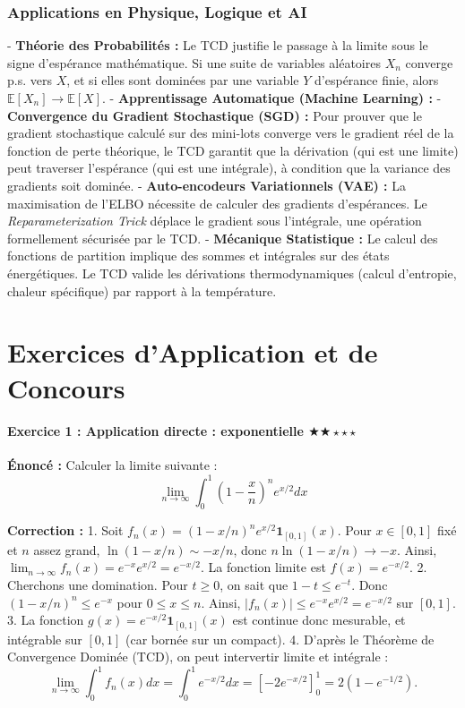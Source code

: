 \documentclass[11pt,a4paper]{article}
\begin{document}
\section{Applications en Physique, Logique et AI}

- \textbf{Théorie des Probabilités :} Le TCD justifie le passage à la limite sous le signe d'espérance mathématique. Si une suite de variables aléatoires $X_n$ converge p.s. vers $X$, et si elles sont dominées par une variable $Y$ d'espérance finie, alors $\mathbb{E}[X_n] \to \mathbb{E}[X]$.
- \textbf{Apprentissage Automatique (Machine Learning) :}
    - \textbf{Convergence du Gradient Stochastique (SGD) :} Pour prouver que le gradient stochastique calculé sur des mini-lots converge vers le gradient réel de la fonction de perte théorique, le TCD garantit que la dérivation (qui est une limite) peut traverser l'espérance (qui est une intégrale), à condition que la variance des gradients soit dominée.
    - \textbf{Auto-encodeurs Variationnels (VAE) :} La maximisation de l'ELBO nécessite de calculer des gradients d'espérances. Le \textit{Reparameterization Trick} déplace le gradient sous l'intégrale, une opération formellement sécurisée par le TCD.
- \textbf{Mécanique Statistique :} Le calcul des fonctions de partition implique des sommes et intégrales sur des états énergétiques. Le TCD valide les dérivations thermodynamiques (calcul d'entropie, chaleur spécifique) par rapport à la température.


\newpage
\part{Exercices d'Application et de Concours}
\subsection*{{Exercice 1 : Application directe : exponentielle \quad $\bigstar\bigstar\star\star\star$}}

\textbf{Énoncé :}
Calculer la limite suivante :
$$ \lim_{n \to \infty} \int_0^{1} \left(1 - \frac{x}{n}\right)^n e^{x/2} dx $$

\textbf{Correction :}
1. Soit $f_n(x) = (1 - x/n)^n e^{x/2} \mathbf{1}_{[0, 1]}(x)$. Pour $x \in [0, 1]$ fixé et $n$ assez grand, $\ln(1 - x/n) \sim -x/n$, donc $n \ln(1 - x/n) \to -x$. Ainsi, $\lim_{n \to \infty} f_n(x) = e^{-x} e^{x/2} = e^{-x/2}$. La fonction limite est $f(x) = e^{-x/2}$.
2. Cherchons une domination. Pour $t \ge 0$, on sait que $1 - t \le e^{-t}$. Donc $(1 - x/n)^n \le e^{-x}$ pour $0 \le x \le n$.
Ainsi, $|f_n(x)| \le e^{-x} e^{x/2} = e^{-x/2}$ sur $[0, 1]$.
3. La fonction $g(x) = e^{-x/2} \mathbf{1}_{[0, 1]}(x)$ est continue donc mesurable, et intégrable sur $[0, 1]$ (car bornée sur un compact).
4. D'après le Théorème de Convergence Dominée (TCD), on peut intervertir limite et intégrale :
$$ \lim_{n \to \infty} \int_0^1 f_n(x) dx = \int_0^1 e^{-x/2} dx = \left[ -2 e^{-x/2} \right]_0^1 = 2(1 - e^{-1/2}). $$
\end{document}
